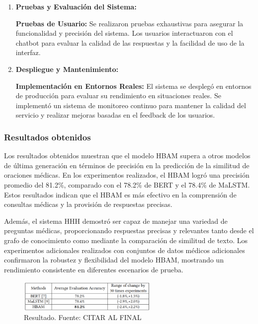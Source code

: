 \begin{enumerate}
		\item \textbf{Pruebas y Evaluación del Sistema:}
		
			\subitem \textbf{Pruebas de Usuario:} Se realizaron pruebas exhaustivas para asegurar la funcionalidad y precisión del sistema. Los usuarios interactuaron con el chatbot para evaluar la calidad de las respuestas y la facilidad de uso de la interfaz.
		
		\item \textbf{Despliegue y Mantenimiento:}
		
			\subitem \textbf{Implementación en Entornos Reales:} El sistema se desplegó en entornos de producción para evaluar su rendimiento en situaciones reales. Se implementó un sistema de monitoreo continuo para mantener la calidad del servicio y realizar mejoras basadas en el feedback de los usuarios.
		
	\end{enumerate}

	\subsubsection{Resultados obtenidos}
		Los resultados obtenidos muestran que el modelo HBAM supera a otros modelos de última generación en términos de precisión en la predicción de la similitud de oraciones médicas. En los experimentos realizados, el HBAM logró una precisión promedio del 81.2\%, comparado con el 78.2\% de BERT y el 78.4\% de MaLSTM. Estos resultados indican que el HBAM es más efectivo en la comprensión de consultas médicas y la provisión de respuestas precisas.

		Además, el sistema HHH demostró ser capaz de manejar una variedad de preguntas médicas, proporcionando respuestas precisas y relevantes tanto desde el grafo de conocimiento como mediante la comparación de similitud de texto. Los experimentos adicionales realizados con conjuntos de datos médicos adicionales confirmaron la robustez y flexibilidad del modelo HBAM, mostrando un rendimiento consistente en diferentes escenarios de prueba.

			\begin{figure}[h]
				\begin{center}
					\includegraphics[width=0.6\textwidth]{2/1_antecedentes/Resultado-5.png}
					\caption{Resultado. Fuente: CITAR AL FINAL }
				\end{center}
			\end{figure}
			
